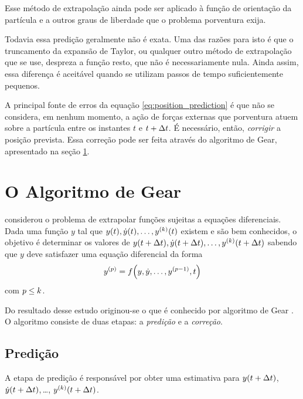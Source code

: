 Esse método de extrapolação ainda pode ser aplicado à função de orientação da partícula e a outros graus de liberdade que o problema porventura exija.

Todavia essa predição geralmente não é exata. Uma das razões para isto é que o truncamento da expansão de Taylor, ou qualquer outro método de extrapolação que se use, despreza a função resto, que não é necessariamente nula. Ainda assim, essa diferença é aceitável quando se utilizam passos de tempo suficientemente pequenos. 

A principal fonte de erros da equação \eqref{eq:position_prediction} é que não se considera, em nenhum momento, a ação de forças externas que porventura atuem sobre a partícula entre os instantes \(t\) e \(t + \Delta t\). É necessário, então, \textit{corrigir} a posição prevista. Essa correção pode ser feita através do algoritmo de Gear, apresentado na seção \ref{sec:gear_integration_scheme}.

\section{O Algoritmo de Gear} \label{sec:gear_integration_scheme}

 considerou o problema de extrapolar funções sujeitas a equações diferenciais. Dada uma função \(y\) tal que \(y(t), \deriv{1}{y}(t),\dots, \deriv{\taylorOrder}{y}(t)\) existem e são bem conhecidos, o objetivo é determinar os valores de \(y(t + \Dt), \deriv{1}{y}(t + \Dt),\dots, \deriv{\taylorOrder}{y}(t + \Dt)\) sabendo que \(y\) deve satisfazer uma equação diferencial da forma
\begin{equation} \label{eq:gear_diff}
	\deriv{\eqOrder}{y} = f\pqty{y, \deriv{1}{y},\dots,\deriv{\eqOrder-1}{y}, t}
\end{equation}
com \(p \leq k\).

Do resultado desse estudo originou-se o que é conhecido por algoritmo de Gear \cite{bib:computational_granular_dynamics}. O algoritmo consiste de duas etapas: a \textit{predição} e a \textit{correção}.

\subsection{Predição}

A etapa de predição é responsável por obter uma estimativa para \(y(t + \Delta t)\), \(\deriv{1}{y}(t + \Dt)\),\,\dots, \(\deriv{\taylorOrder}{y}(t + \Dt)\).


